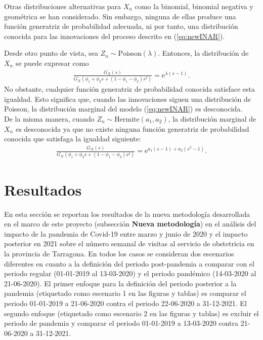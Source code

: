 \documentclass[12pt,twoside]{article} %
\begin{document}
\medskip

\noindent Otras distribuciones alternativas para $X_n$ como la binomial, binomial negativa y geométrica se han considerado. Sin embargo, ninguna de ellas produce una función generatriz de probabilidad adecuada, ni por tanto, una distribución conocida para las innovaciones del proceso descrito en (\ref{eq:newINAR}). 

\medskip

\noindent Desde otro punto de vista, sea $Z_n \sim \textrm{Poisson}(\lambda)$. Entonces, la distribución de $X_n$ se puede expresar como
\begin{align}
\frac{G_X(s)}{G_X(\phi_1+\phi_2s+(1-\phi_1-\phi_2)s^2)}=\textrm{e}^{\lambda(s-1)}.
\end{align}
No obstante, cualquier función generatriz de probabilidad conocida satisface esta igualdad. Esto significa que, cuando las innovaciones siguen una distribución de Poisson, la distribución marginal del modelo (\ref{eq:newINAR}) es desconocida. \\ De la misma manera, cuando $Z_n \sim \textrm{Hermite}(a_1, a_2)$, la distribución marginal de $X_n$ es desconocida ya que no existe ninguna función generatriz de probabilidad conocida que satisfaga la igualdad siguiente:
\begin{align}
\frac{G_X(s)}{G_X(\phi_1+\phi_2s+(1-\phi_1-\phi_2)s^2)}=\textrm{e}^{a_1(s-1)+a_2(s^2-1)}.
\end{align}

\section{Resultados}
En esta sección se reportan los resultados de la nueva metodología desarrollada en el marco de este proyecto (subsección \textbf{Nueva metodología}) en el análisis del impacto de la pandemia de Covid-19 entre marzo y junio de 2020 y el impacto posterior en 2021 sobre el número semanal de visitas al servicio de obstetricia en la provincia de Tarragona. En todos los casos se consideran dos escenarios diferentes en cuanto a la definición del periodo post-pandemia a comparar con el periodo regular (01-01-2019 al 13-03-2020) y el periodo pandémico (14-03-2020 al 21-06-2020). El primer enfoque para la definición del periodo posterior a la pandemia (etiquetado como escenario 1 en las figuras y tablas) es comparar el periodo 01-01-2019 a 21-06-2020 contra el periodo 22-06-2020 a 31-12-2021. El segundo enfoque (etiquetado como escenario 2 en las figuras y tablas) es excluir el periodo de pandemia y comparar el periodo 01-01-2019 a 13-03-2020 contra 21-06-2020 a 31-12-2021.
\end{document}
